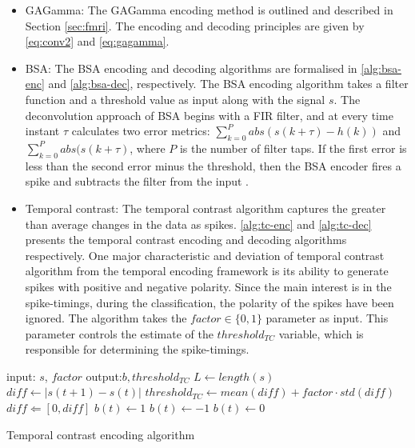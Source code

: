 \begin{itemize}
	\item GAGamma: The GAGamma encoding method is outlined and described in Section \ref{sec:fmri}. The encoding and decoding principles are given by \equationnames \ref{eq:conv2} and \ref{eq:gagamma}.
	
	\item BSA: The BSA encoding and decoding algorithms \citep{schrauwen2003bsa} are formalised in \algorithmnames \ref{alg:bsa-enc} and \ref{alg:bsa-dec}, respectively. The BSA encoding algorithm takes a filter function and a threshold value as input along with the signal $s$. The deconvolution approach of BSA begins with a FIR filter, and at every time instant $\tau$ calculates two error metrics: $\sum_{k=0}^{P}abs(s(k+\tau)-h(k))$ and $\sum_{k=0}^{P}abs(s(k+\tau)$, where $P$ is the number of filter taps. If the first error is less than the second error minus the threshold, then the BSA encoder fires a spike and subtracts the filter from the input \citep{schrauwen2003bsa}.  
	
	\item Temporal contrast: The temporal contrast algorithm captures the greater than average changes in the data as spikes. \algorithmnames \ref{alg:tc-enc} and \ref{alg:tc-dec} presents the temporal contrast encoding and decoding algorithms respectively. One major characteristic and deviation of temporal contrast algorithm from the temporal encoding framework is its ability to generate spikes with positive and negative polarity. Since the main interest is in the spike-timings, during the classification, the polarity of the spikes have been ignored. The algorithm takes the $factor\in \{0, 1\}$ parameter as input. This parameter controls the estimate of the $threshold_{TC}$ variable, which is responsible for determining the spike-timings. 
	
\end{itemize}
\begin{algorithm}
		\begin{algorithmic}[1]
			\STATE input: $s$, $factor$
			\STATE output:$b, threshold_{TC}$
			\STATE $L\leftarrow length(s)$
			\STATE $diff\leftarrow |s(t+1)-s(t)|$
			\ENDFOR
			\STATE $threshold_{TC}\leftarrow mean(diff)+factor\cdot std(diff)$
			\STATE $diff\Leftarrow [0,diff]$
			\STATE $b(t)\leftarrow 1$
			\STATE $b(t)\leftarrow -1$
			\ELSE
			\STATE $b(t)\leftarrow 0$
			\ENDIF
			\ENDFOR
			\caption{Temporal contrast encoding algorithm}
			\label{alg:tc-enc}
		\end{algorithmic}
	\end{algorithm}

